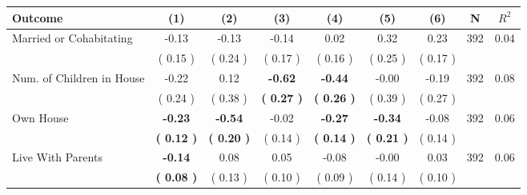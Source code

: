 \begin{tabular}{lcccccccc}
\toprule
 \textbf{Outcome} & \textbf{(1)} & \textbf{(2)} & \textbf{(3)} & \textbf{(4)} & \textbf{(5)} & \textbf{(6)} & \textbf{N} & \textbf{$ R^2$} \\
\midrule
Married or Cohabitating &     -0.13 &     -0.13 &     -0.14 &      0.02 &      0.32 &      0.23 & 392 &       0.04 \\ 
 & (     0.15 ) & (     0.24 ) & (     0.17 ) & (     0.16 ) & (     0.25 ) & (     0.17 ) & \\
Num. of Children in House &     -0.22 &      0.12 & \textbf{    -0.62} & \textbf{    -0.44} &     -0.00 &     -0.19 & 392 &       0.08 \\ 
 & (     0.24 ) & (     0.38 ) & \textbf{(     0.27 )} & \textbf{(     0.26 )} & (     0.39 ) & (     0.27 ) & \\
Own House & \textbf{    -0.23} & \textbf{    -0.54} &     -0.02 & \textbf{    -0.27} & \textbf{    -0.34} &     -0.08 & 392 &       0.06 \\ 
 & \textbf{(     0.12 )} & \textbf{(     0.20 )} & (     0.14 ) & \textbf{(     0.14 )} & \textbf{(     0.21 )} & (     0.14 ) & \\
Live With Parents & \textbf{    -0.14} &      0.08 &      0.05 &     -0.08 &     -0.00 &      0.03 & 392 &       0.06 \\ 
 & \textbf{(     0.08 )} & (     0.13 ) & (     0.10 ) & (     0.09 ) & (     0.14 ) & (     0.10 ) & \\
\bottomrule
\end{tabular}
